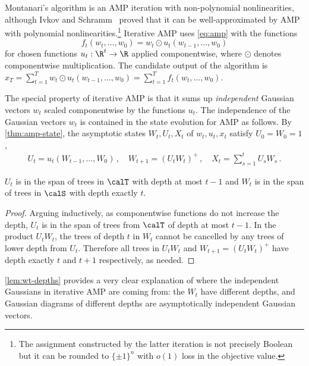 \documentclass[12pt]{article}
\begin{document}
Montanari's algorithm is an AMP iteration with
non-polynomial nonlinearities, although Ivkov and
Schramm~\cite[Lemma B.4]{ivkov2023semidefinite} proved that it
can be well-approximated by AMP with
polynomial
nonlinearities.\footnote{The assignment constructed
by the latter iteration is not precisely Boolean but it can be rounded to
$\{\pm 1\}^n$ with $o(1)$ loss 
in the objective value.} Iterative AMP \cite{montanari2021optimization} uses \cref{eq:amp} with the functions
\begin{equation}
f_t(w_t, \dots, w_0) = w_t \odot u_t(w_{t-1}, \dots, w_0) \label{eq:iamp}
\end{equation}
for chosen functions $u_t : \R^{t} \to \R$ applied componentwise, where $\odot$ denotes componentwise multiplication.
The candidate output of the algorithm is $x_T = \sum_{t = 1}^T w_t \odot u_t(w_{t-1}, \dots, w_0) = \sum_{t = 1}^T f_t(w_t, \dots, w_0)$.


The special property of iterative AMP is that it sums up \emph{independent} Gaussian
vectors $w_t$ scaled componentwise by the functions $u_t$.
The independence of the Gaussian vectors $w_t$ is contained in the state evolution for AMP as follows.
By \cref{thm:amp-state}, the asymptotic states $W_t, U_t, X_t$ of $w_t, u_t, x_t$ satisfy $U_0=W_0=1$,
\begin{align*}
    U_t = u_t(W_{t-1},\ldots,W_0)\,,\quad W_{t+1} = (U_t W_t)^+\,, \quad X_t = \sum_{s = 1}^t U_sW_s\,.\label{eq:iterative-asymptotic}
\end{align*}

\begin{claim}\label{lem:wt-depths}
    $U_t$ is in the span of trees in $\calT$ with depth at most $t-1$ and $W_t$ is in the span of trees in $\calS$ with depth exactly $t$.
\end{claim}
\begin{proof}Arguing inductively, as componentwise functions do not increase the depth, $U_t$ is in the span of trees from $\calT$ of depth at most $t-1$.
     In the product $U_t W_t$, the trees of depth $t$ in $W_t$ cannot be cancelled
     by any trees of lower depth from $U_t$. Therefore all trees in
     $U_tW_t$ and $W_{t+1} = (U_tW_t)^+$ have depth exactly $t$ and $t+1$ respectively, as needed.
\end{proof}
\cref{lem:wt-depths} provides a very
clear explanation of where the independent Gaussians in iterative AMP are coming from:
the $W_t$ have different depths, and Gaussian diagrams of different depths are asymptotically independent Gaussian vectors.
\end{document}
